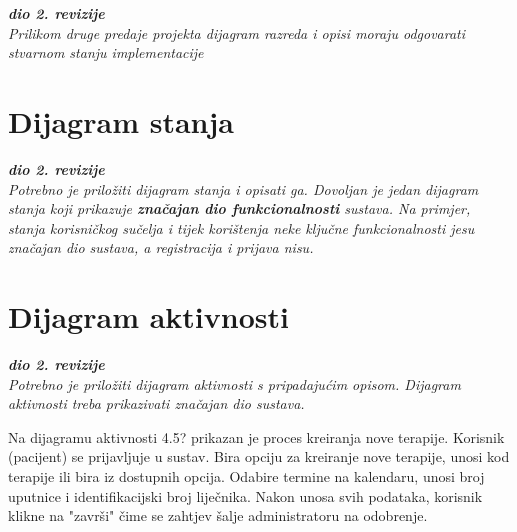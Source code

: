   

   
   \textbf{\textit{dio 2. revizije}}\\			
			
			\textit{Prilikom druge predaje projekta dijagram razreda i opisi moraju odgovarati stvarnom stanju implementacije}
			
			
			
			\eject
		
		\section{Dijagram stanja}
			
			
			\textbf{\textit{dio 2. revizije}}\\
			
			\textit{Potrebno je priložiti dijagram stanja i opisati ga. Dovoljan je jedan dijagram stanja koji prikazuje \textbf{značajan dio funkcionalnosti} sustava. Na primjer, stanja korisničkog sučelja i tijek korištenja neke ključne funkcionalnosti jesu značajan dio sustava, a registracija i prijava nisu. }
			
			
			\eject 
		
		\section{Dijagram aktivnosti}
			
			\textbf{\textit{dio 2. revizije}}\\
			
			 \textit{Potrebno je priložiti dijagram aktivnosti s pripadajućim opisom. Dijagram aktivnosti treba prikazivati značajan dio sustava.}\newline

            Na dijagramu aktivnosti 4.5? prikazan je proces kreiranja nove terapije. Korisnik (pacijent) se prijavljuje u sustav. Bira opciju za kreiranje nove terapije, unosi kod terapije ili bira iz dostupnih opcija. Odabire termine na kalendaru, unosi broj uputnice i identifikacijski broj liječnika. Nakon unosa svih podataka, korisnik klikne na "završi" čime se zahtjev šalje administratoru na odobrenje.            
            
